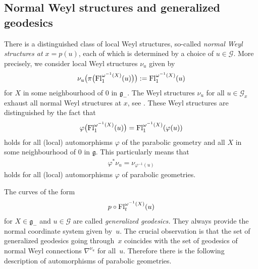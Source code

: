 \documentclass[pdftex]{sigma}
\newcommand{\om}{\omega}
\newcommand{\ba}{\mathcal{G}}
\newcommand{\va}{\varphi}
\newcommand{\fg}{\mathfrak g}
\newcommand{\Fl}{{\rm Fl}}
\numberwithin{equation}{section}
\begin{document}
\subsection{Normal Weyl structures and generalized geodesics} There is a distinguished class of local Weyl structures, so-called \emph{normal Weyl structures at $x=p(u)$}, each of which is determined by a choice of $u\in \ba$.
More precisely, we consider local Weyl structures $\nu_u$ given by
\begin{gather*}\nu_u\big(\pi\big(\Fl_1^{\om^{-1}(X)}(u)\big)\big):=\Fl_1^{\om^{-1}(X)}(u)\end{gather*} for $X$ in some neighbourhood of $0$ in $\fg_-$. The Weyl structures $\nu_u$ for all $u\in \ba_x$ exhaust all normal Weyl structures at $x$, see \cite[Section~5.1.12]{parabook}.
These Weyl structures are distinguished by the fact that
\begin{gather}\label{autpos}
\va\big(\Fl^{\om^{-1}(X)}_1(u)\big)=\Fl^{\om^{-1}(X)}_1(\va(u))
\end{gather}
holds for all (local) automorphisms $\va$ of the parabolic geometry and all $X$ in some neighbourhood of $0$ in $\fg$. This particularly means that
\begin{gather*}\va^*\nu_u=\nu_{\va^{-1}(u)}\end{gather*}
holds for all (local) automorphisms $\va$ of parabolic geometries.

The curves of the form
\begin{gather*}p\circ \Fl_t^{\om^{-1}(X)}(u)\end{gather*}
for $X\in \fg_-$ and $u \in \ba$ are called \emph{generalized geodesics.} They always provide the normal coordinate system given by~$u$. The crucial observation is that the set of generalized geodesics going through~$x$ coincides with the set of geodesics of normal Weyl connections $\nabla^{\nu_u}$ for all~$u$. Therefore there is the following description of automorphisms of parabolic geometries.
\end{document}

